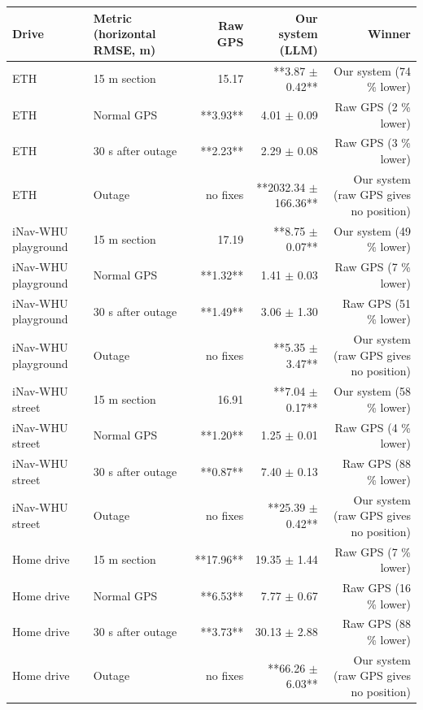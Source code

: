 \begin{tabular}{llrrr}
\toprule
Drive & Metric (horizontal RMSE, m) & Raw GPS & Our system (LLM) & Winner \\
\midrule
ETH & 15 m section & 15.17 & **3.87 $\pm$ 0.42** & Our system (74 \% lower) \\
ETH & Normal GPS & **3.93** & 4.01 $\pm$ 0.09 & Raw GPS (2 \% lower) \\
ETH & 30 s after outage & **2.23** & 2.29 $\pm$ 0.08 & Raw GPS (3 \% lower) \\
ETH & Outage & no fixes & **2032.34 $\pm$ 166.36** & Our system (raw GPS gives no position) \\
iNav-WHU playground & 15 m section & 17.19 & **8.75 $\pm$ 0.07** & Our system (49 \% lower) \\
iNav-WHU playground & Normal GPS & **1.32** & 1.41 $\pm$ 0.03 & Raw GPS (7 \% lower) \\
iNav-WHU playground & 30 s after outage & **1.49** & 3.06 $\pm$ 1.30 & Raw GPS (51 \% lower) \\
iNav-WHU playground & Outage & no fixes & **5.35 $\pm$ 3.47** & Our system (raw GPS gives no position) \\
iNav-WHU street & 15 m section & 16.91 & **7.04 $\pm$ 0.17** & Our system (58 \% lower) \\
iNav-WHU street & Normal GPS & **1.20** & 1.25 $\pm$ 0.01 & Raw GPS (4 \% lower) \\
iNav-WHU street & 30 s after outage & **0.87** & 7.40 $\pm$ 0.13 & Raw GPS (88 \% lower) \\
iNav-WHU street & Outage & no fixes & **25.39 $\pm$ 0.42** & Our system (raw GPS gives no position) \\
Home drive & 15 m section & **17.96** & 19.35 $\pm$ 1.44 & Raw GPS (7 \% lower) \\
Home drive & Normal GPS & **6.53** & 7.77 $\pm$ 0.67 & Raw GPS (16 \% lower) \\
Home drive & 30 s after outage & **3.73** & 30.13 $\pm$ 2.88 & Raw GPS (88 \% lower) \\
Home drive & Outage & no fixes & **66.26 $\pm$ 6.03** & Our system (raw GPS gives no position) \\
\bottomrule
\end{tabular}
